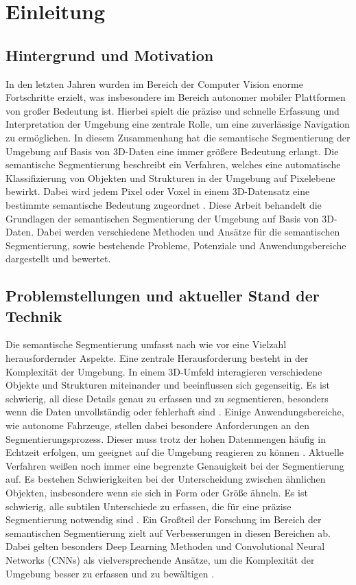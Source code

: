 \chapter{Einleitung}

\section{Hintergrund und Motivation}

In den letzten Jahren wurden im Bereich der Computer Vision enorme Fortschritte
erzielt, was insbesondere im Bereich autonomer mobiler Plattformen von großer
Bedeutung ist. Hierbei spielt die präzise und schnelle Erfassung und
Interpretation der Umgebung eine zentrale Rolle, um eine zuverlässige
Navigation zu ermöglichen. In diesem Zusammenhang hat die semantische
Segmentierung der Umgebung auf Basis von 3D-Daten eine immer größere Bedeutung
erlangt. Die semantische Segmentierung beschreibt ein Verfahren, welches eine
automatische Klassifizierung von Objekten und Strukturen in der Umgebung auf
Pixelebene bewirkt. Dabei wird jedem Pixel oder Voxel in einem 3D-Datensatz
eine bestimmte semantische Bedeutung zugeordnet \cite{CGV-079}. Diese Arbeit
behandelt die Grundlagen der semantischen Segmentierung der Umgebung auf Basis
von 3D-Daten. Dabei werden verschiedene Methoden und Ansätze für die
semantischen Segmentierung, sowie bestehende Probleme, Potenziale und
Anwendungsbereiche dargestellt und bewertet. \cite{9102769}

\section{Problemstellungen und aktueller Stand der Technik}

Die semantische Segmentierung umfasst nach wie vor eine Vielzahl
herausfordernder Aspekte. Eine zentrale Herausforderung besteht in der
Komplexität der Umgebung. In einem 3D-Umfeld interagieren verschiedene Objekte
und Strukturen miteinander und beeinflussen sich gegenseitig. Es ist schwierig,
all diese Details genau zu erfassen und zu segmentieren, besonders wenn die
Daten unvollständig oder fehlerhaft sind \cite{CGV-079}. Einige
Anwendungsbereiche, wie autonome Fahrzeuge, stellen dabei besondere
Anforderungen an den Segmentierungsprozess. Dieser muss trotz der hohen
Datenmengen häufig in Echtzeit erfolgen, um geeignet auf die Umgebung reagieren
zu können \cite{8206396}. Aktuelle Verfahren weißen noch immer eine begrenzte
Genauigkeit bei der Segmentierung auf. Es bestehen Schwierigkeiten bei der
Unterscheidung zwischen ähnlichen Objekten, insbesondere wenn sie sich in Form
oder Größe ähneln. Es ist schwierig, alle subtilen Unterschiede zu erfassen,
die für eine präzise Segmentierung notwendig sind \cite{9420573}. Ein Großteil
der Forschung im Bereich der semantischen Segmentierung zielt auf
Verbesserungen in diesen Bereichen ab. Dabei gelten besonders Deep Learning
Methoden und Convolutional Neural Networks (CNNs) als vielversprechende
Ansätze, um die Komplexität der Umgebung besser zu erfassen und zu bewältigen
\cite{9423307,8100085}.